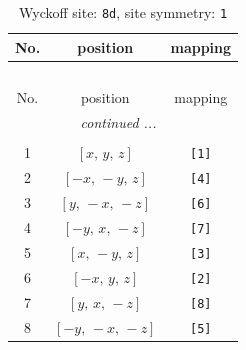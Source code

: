 \documentclass[fleqn,8pt]{jsarticle}
\begin{document}
\begin{longtable}{ccc}
\caption{Wyckoff site: {\tt 8d}, site symmetry: {\tt 1}}
 \\
 \hline \hline
No. & position & mapping \\ \hline \endfirsthead

\multicolumn{2}{l}{\tablename\ \thetable{}} \\
 \hline \hline
No. & position & mapping \\ \hline \endhead

 \hline \hline
\multicolumn{2}{r}{\footnotesize\it continued ...} \\ \endfoot

 \hline \hline
\multicolumn{2}{r}{} \\ \endlastfoot

1 & $\left[ x,\, y,\, z \right]$ & {\tt [1]} \\ \hline
2 & $\left[ - x,\, - y,\, z \right]$ & {\tt [4]} \\ \hline
3 & $\left[ y,\, - x,\, - z \right]$ & {\tt [6]} \\ \hline
4 & $\left[ - y,\, x,\, - z \right]$ & {\tt [7]} \\ \hline
5 & $\left[ x,\, - y,\, z \right]$ & {\tt [3]} \\ \hline
6 & $\left[ - x,\, y,\, z \right]$ & {\tt [2]} \\ \hline
7 & $\left[ y,\, x,\, - z \right]$ & {\tt [8]} \\ \hline
8 & $\left[ - y,\, - x,\, - z \right]$ & {\tt [5]} \\
\end{longtable}
\end{document}
